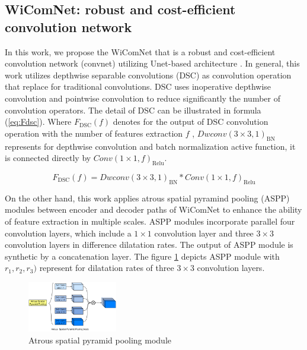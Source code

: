 \documentclass[journal]{IEEEtran} %
\begin{document}
\subsection{WiComNet: robust and cost-efficient convolution network}
In this work, we propose the WiComNet that is a robust and cost-efficient convolution network (convnet) utilizing Unet-based architecture \cite{ronneberger2015u}. In general, this work utilizes depthwise separable convolutions (DSC) \cite{CholletXception} as convolution operation that replace for traditional convolutions. DSC uses inoperative depthwise convolution and pointwise convolution to reduce significantly the number of convolution operators. The detail of DSC can be illustrated in formula (\ref{eq:Fdsc}). Where \(F_{\text{DSC}}(f)\) denotes for the output of DSC convolution operation with the number of features extraction \(f\) , \(Dwconv(3\times3,1)_{\text{BN}}\) represents for depthwise convolution and batch normalization active function, it is connected directly by \(Conv(1\times1,f)_{\text{Relu}}\).

\begin{equation}
    F_{\text{DSC}}(f) = Dwconv(3\times3,1)_{\text{BN}} * Conv(1\times1,f)_{\text{Relu}}
    \label{eq:Fdsc}
\end{equation}

\indent On the other hand, this work applies atrous spatial pyramind pooling (ASPP) modules \cite{ChenAtrous} between encoder and decoder paths of WiComNet to enhance the ability of feature extraction in multiple scales. ASPP modules incorporate parallel four convolution layers, which include a \(1\times1\) convolution layer and three \(3\times3\) convolution layers in difference dilatation rates. The output of ASPP module is synthetic by a concatenation layer. The figure \ref{fig3} depicts ASPP module with \(r_1, r_2, r_3)\) represent for dilatation rates of three \(3\times3\) convolution layers. 

\begin{figure}[!ht]
    \centering
    \includegraphics[width=0.35\textwidth]{img/Design-ASPP.jpg}
    \caption{Atrous spatial pyramid pooling module}
    \label{fig3}
\end{figure}
\end{document}
